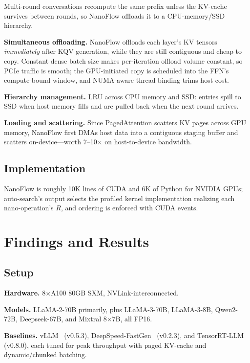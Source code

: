 \documentclass[manuscript,review]{acmart}
\newcommand{\nf}{NanoFlow\xspace}   %
\begin{document}
Multi-round conversations recompute the same prefix unless the KV-cache survives between rounds, so \nf 
offloads it to a CPU-memory/SSD hierarchy.

\textbf{Simultaneous offloading.} \nf offloads each layer's KV tensors \emph{immediately} after KQV generation, 
while they are still contiguous and cheap to copy. Constant dense batch size makes per-iteration offload volume 
constant, so PCIe traffic is smooth; the GPU-initiated copy is scheduled into the FFN's compute-bound window, 
and NUMA-aware thread binding trims host cost.

\textbf{Hierarchy management.} LRU across CPU memory and SSD: entries spill to SSD when host memory fills and 
are pulled back when the next round arrives.

\textbf{Loading and scattering.} Since PagedAttention scatters KV pages across GPU memory, \nf first DMAs host 
data into a contiguous staging buffer and scatters on-device---worth 7--10$\times$ on host-to-device bandwidth.

\subsection{Implementation}

\nf is roughly 10K lines of CUDA and 6K of Python for NVIDIA GPUs; auto-search's output selects the profiled 
kernel implementation realizing each nano-operation's $R$, and ordering is enforced with CUDA events.

\section{Findings and Results}
\label{sec:results}

\subsection{Setup}

\textbf{Hardware.} 8$\times$A100 80GB SXM, NVLink-interconnected.

\textbf{Models.} LLaMA-2-70B primarily, plus LLaMA-3-70B, LLaMA-3-8B, Qwen2-72B, Deepseek-67B, and 
Mixtral 8$\times$7B, all FP16.

\textbf{Baselines.} vLLM~\cite{kwon2023efficient, vllm2024} (v0.5.3), 
DeepSpeed-FastGen~\cite{holmes2024deepspeed, microsoft2024fastgen} (v0.2.3), and 
TensorRT-LLM~\cite{nvidia2024tensorrt, nvidia2024trtllm} (v0.8.0), each tuned for peak throughput with paged
KV-cache and dynamic/chunked batching.
\end{document}

